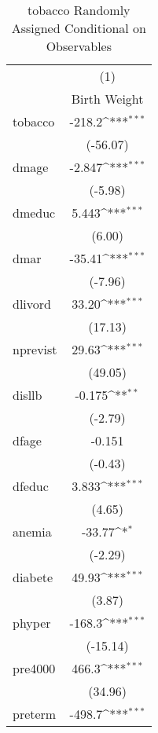 {
\def\sym#1{\ifmmode^{#1}\else\(^{#1}\)\fi}
\begin{longtable}{l*{1}{c}}
\caption{tobacco Randomly Assigned Conditional on Observables\label{b1}}\\
\hline\hline\endfirsthead\hline\endhead\hline\endfoot\endlastfoot
            &\multicolumn{1}{c}{(1)}\\
            &\multicolumn{1}{c}{Birth Weight}\\
\hline
tobacco     &      -218.2\sym{***}\\
            &    (-56.07)         \\
[1em]
dmage       &      -2.847\sym{***}\\
            &     (-5.98)         \\
[1em]
dmeduc      &       5.443\sym{***}\\
            &      (6.00)         \\
[1em]
dmar        &      -35.41\sym{***}\\
            &     (-7.96)         \\
[1em]
dlivord     &       33.20\sym{***}\\
            &     (17.13)         \\
[1em]
nprevist    &       29.63\sym{***}\\
            &     (49.05)         \\
[1em]
disllb      &      -0.175\sym{**} \\
            &     (-2.79)         \\
[1em]
dfage       &      -0.151         \\
            &     (-0.43)         \\
[1em]
dfeduc      &       3.833\sym{***}\\
            &      (4.65)         \\
[1em]
anemia      &      -33.77\sym{*}  \\
            &     (-2.29)         \\
[1em]
diabete     &       49.93\sym{***}\\
            &      (3.87)         \\
[1em]
phyper      &      -168.3\sym{***}\\
            &    (-15.14)         \\
[1em]
pre4000     &       466.3\sym{***}\\
            &     (34.96)         \\
[1em]
preterm     &      -498.7\sym{***}\\

\end{longtable}}
